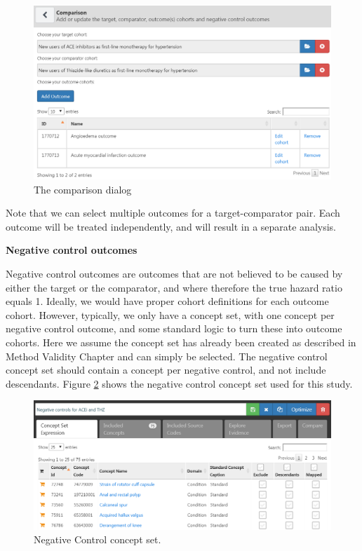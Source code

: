 \documentclass[]{book}
\begin{document}
\begin{figure}

{\centering \includegraphics[width=1\linewidth]{images/PopulationLevelEstimation/comparisons} 

}

\caption{The comparison dialog}\label{fig:comparisons}
\end{figure}

Note that we can select multiple outcomes for a target-comparator pair. Each outcome will be treated independently, and will result in a separate analysis.

\textbf{Negative control outcomes}

Negative control outcomes are outcomes that are not believed to be caused by either the target or the comparator, and where therefore the true hazard ratio equals 1. Ideally, we would have proper cohort definitions for each outcome cohort. However, typically, we only have a concept set, with one concept per negative control outcome, and some standard logic to turn these into outcome cohorts. Here we assume the concept set has already been created as described in Method Validity Chapter and can simply be selected. The negative control concept set should contain a concept per negative control, and not include descendants. Figure \ref{fig:ncConceptSet} shows the negative control concept set used for this study.

\begin{figure}

{\centering \includegraphics[width=1\linewidth]{images/PopulationLevelEstimation/ncConceptSet} 

}

\caption{Negative Control concept set.}\label{fig:ncConceptSet}
\end{figure}
\end{document}
